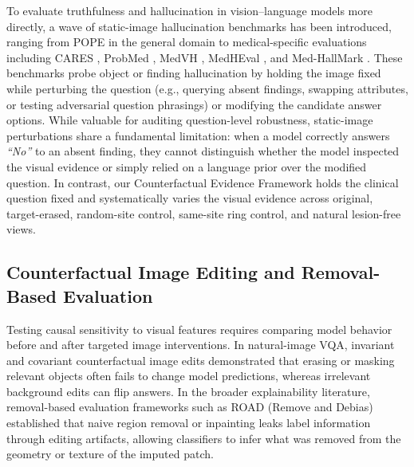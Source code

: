 \documentclass{article} %
\begin{document}
To evaluate truthfulness and hallucination in vision--language models more directly, a wave of static-image hallucination benchmarks has been introduced, ranging from POPE \citep{li2023pope} in the general domain to medical-specific evaluations including CARES \citep{xia2024cares}, ProbMed \citep{yan2024probmed}, MedVH \citep{gu2024medvh}, MedHEval \citep{chang2024medheval}, and Med-HallMark \citep{chen2024medhallmark}. These benchmarks probe object or finding hallucination by holding the image fixed while perturbing the question (e.g., querying absent findings, swapping attributes, or testing adversarial question phrasings) or modifying the candidate answer options. While valuable for auditing question-level robustness, static-image perturbations share a fundamental limitation: when a model correctly answers \emph{``No''} to an absent finding, they cannot distinguish whether the model inspected the visual evidence or simply relied on a language prior over the modified question. In contrast, our Counterfactual Evidence Framework holds the clinical question fixed and systematically varies the visual evidence across original, target-erased, random-site control, same-site ring control, and natural lesion-free views.

\subsection{Counterfactual Image Editing and Removal-Based Evaluation}
\label{subsec:rw_counterfactual}
Testing causal sensitivity to visual features requires comparing model behavior before and after targeted image interventions. In natural-image VQA, invariant and covariant counterfactual image edits \citep{agarwal2020towards} demonstrated that erasing or masking relevant objects often fails to change model predictions, whereas irrelevant background edits can flip answers. In the broader explainability literature, removal-based evaluation frameworks such as ROAD (Remove and Debias) \citep{rong2022road} established that naive region removal or inpainting leaks label information through editing artifacts, allowing classifiers to infer what was removed from the geometry or texture of the imputed patch.
\end{document}
